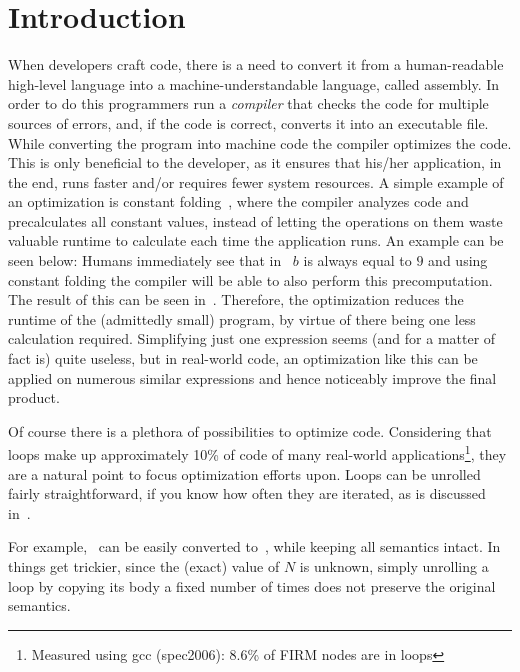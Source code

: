 \chapter{Introduction}\label{sec:intro}



When developers craft code, there is a need to convert it from a human-readable high-level language into a machine-understandable language, called assembly.
In order to do this programmers run a \textit{compiler} that checks the code for multiple sources of errors, and, if the code is correct, converts it into an executable file.
While converting the program into machine code the compiler optimizes the code.
This is only beneficial to the developer, as it ensures that his/her application, in the end, runs faster and/or requires fewer system resources.
A simple example of an optimization is constant folding~\cite{aho_2014}, where the compiler analyzes code and precalculates all constant values, instead of letting the operations on them waste valuable runtime to calculate each time the application runs.
An example can be seen below:
Humans immediately see that in~ $b$ is always equal to $9$ and using constant folding the compiler will be able to also perform this precomputation.
The result of this can be seen in~.
Therefore, the optimization reduces the runtime of the (admittedly small) program, by virtue of there being one less calculation required.
Simplifying just one expression seems (and for a matter of fact is) quite useless, but in real-world code, an optimization like this can be applied on numerous similar expressions and hence noticeably improve the final product.



Of course there is a plethora of possibilities to optimize code.
Considering that loops make up approximately 10\% of code of many real-world applications\footnote{Measured using gcc (spec2006): 8.6\% of FIRM nodes are in loops}, they are a natural point to focus optimization efforts upon.
Loops can be unrolled fairly straightforward, if you know how often they are iterated, as is discussed in~.

For example,~ can be easily converted to~, while keeping all semantics intact.
In~ things get trickier, since the (exact) value of $N$ is unknown, simply unrolling a loop by copying its body a fixed number of times does not preserve the original semantics.

